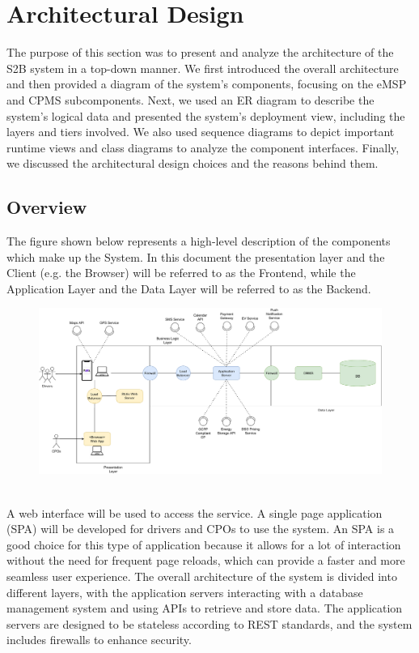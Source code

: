 \section{Architectural Design}
The purpose of this section was to present and analyze the architecture of the S2B system in a top-down manner. We first introduced the overall architecture and then provided a diagram of the system's components, focusing on the eMSP and CPMS subcomponents. Next, we used an ER diagram to describe the system's logical data and presented the system's deployment view, including the layers and tiers involved. We also used sequence diagrams to depict important runtime views and class diagrams to analyze the component interfaces. Finally, we discussed the architectural design choices and the reasons behind them.
\subsection{Overview}
The figure shown below represents a high-level description of the components which make up the System.
In this document the presentation layer and the Client (e.g. the Browser)
will be referred to as the Frontend, while the Application Layer and the Data Layer
will be referred to as the Backend.

\begin{figure}[H]
    \centering
    \includegraphics[scale=0.42]{src/Overview/overview_diagram.pdf}
\end{figure}

\hfill \\
A web interface will be used to access the service. A single page application (SPA) will be developed for drivers and CPOs to use the system. An SPA is a good choice for this type of application because it allows for a lot of interaction without the need for frequent page reloads, which can provide a faster and more seamless user experience. The overall architecture of the system is divided into different layers, with the application servers interacting with a database management system and using APIs to retrieve and store data. The application servers are designed to be stateless according to REST standards, and the system includes firewalls to enhance security.
\pagebreak
